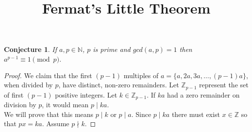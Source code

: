 \documentclass{article}
\title{Fermat's Little Theorem}
\newtheorem*{conjecture}{Conjecture}
\newtheorem*{corollary}{Corollary}
\begin{document}
\maketitle

\begin{conjecture}
If $a,p \in \mathbb{N}$, $p$ is prime and $gcd(a,p) = 1$
then $a^{p-1} \equiv 1 \pmod p$.
\end{conjecture}

\begin{proof}
We claim that the first $(p-1)$ multiples of $a=\{a,2a,3a,\dots,(p-1)a\}$, when divided by $p$, have distinct, non-zero remainders. Let $\mathbb{Z}_{p-1}$ represent the set of first $(p-1)$ positive integers. Let $k \in \mathbb{Z}_{p-1}$. If $ka$ had a zero remainder on division by $p$, it would mean $p \mid ka$.\\

We will prove that this means $p \mid k$ or $p \mid a$.
Since $p\mid ka$ there must exist $x \in \mathbb{Z}$ so that $px=ka$. Assume $p \nmid k$.

\end{proof}

    
% 
    
\end{document}
